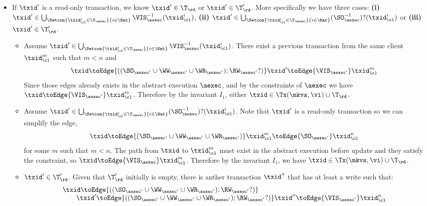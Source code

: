 \begin{itemize}
\begin{itemize}
\item If \( \txid' \) is a read-only transaction, we know \( \txid' \in \T_\rd \) or \( \txid' \in \T'_\rd \).
    More specifically we have three cases: \textbf{(i)} \( \txid' \in \bigcup_{\Setcon{\txid_{\cl}^{i} \in \T_{\aexec} }{ i \in \Nat }} \VIS_{\aexec}^{-1}(\txid^i_\cl) \), \textbf{(ii)} \( \txid' \in \bigcup_{\Setcon{\txid_{\cl}^{i} \in \T_{\aexec} }{ i \in \Nat }} (\SO_{\aexec}^{-1})?(\txid^i_\cl) \) or \textbf{(iii)} \( \txid' \in \T'_\rd\).
    \begin{itemize}
        \item Assume \( \txid' \in \bigcup_{\Setcon{\txid_{\cl}^{i} \in \T_{\aexec} }{ i \in \Nat }} \VIS_{\aexec}^{-1}(\txid^i_\cl) \).
        There exist a previous transaction from the same client \( \txid_\cl^m\) such that \( m < n \) and 
        \[ 
            \txid \toEdge{\left( (\SO_{\aexec'} \cup \WW_{\aexec'} \cup \WR_{\aexec'} ) ; \RW_{\aexec'}? \right) } \txid' \toEdge{\VIS_{\aexec'}}  \txid_\cl^m 
        \]
        Since those edges already exists in the abstract execution \( \aexec\), and by the constraints of \( \aexec \) we have \( \txid \toEdge{\VIS_{\aexec'}} \txid_\cl^m\).
        Therefore by the invariant \( I_1 \), either \( \txid \in \Tx(\mkvs, \vi) \cup \T_\rd \).
    \item Assume \( \txid' \in \bigcup_{\Setcon{\txid_{\cl}^{i} \in \T_{\aexec} }{ i \in \Nat }} (\SO_{\aexec}^{-1})?(\txid^i_\cl) \).
        Note that  \( \txid' \) is a read-only transaction so we can simplify the edge,
        \[ 
            \txid \toEdge{\left( \SO_{\aexec'} \cup \WW_{\aexec'} \cup \WR_{\aexec'}  \right)} \txid_\cl^m \toEdge{\SO_{\aexec'}}  \txid_\cl^n 
        \] 
        for some \( m \) such that \( m < n \).
        The path from \( \txid \) to \( \txid_\cl^m \) must exist in the abstract execution before update and they satisfy the constraint, so \( \txid \toEdge{\VIS_\aexec} \txid_\cl^m \).
        Therefore by the invariant \( I_1 \), we have \( \txid \in \Tx(\mkvs, \vi) \cup \T_\rd \).
    \item \( \txid' \in \T'_\rd \). 
        Given that \( \T'_\rd \) initially is empty, there is anther transaction \( \txid'' \) that has at least a write such that:
        \[
        \begin{array}{l}
            \txid \toEdge{\left( (\SO_{\aexec'} \cup \WW_{\aexec'} \cup \WR_{\aexec'} ) ; \RW_{\aexec'}? \right) } \\
            \qquad \txid' \toEdge{\left( (\SO_{\aexec'} \cup \WW_{\aexec'} \cup \WR_{\aexec'} ) ; \RW_{\aexec'}? \right) } \txid'' \toEdge{\VIS_{\aexec'}}  \txid_\cl^n 

\end{array}\]
\end{itemize}
\end{itemize}
\end{itemize}
